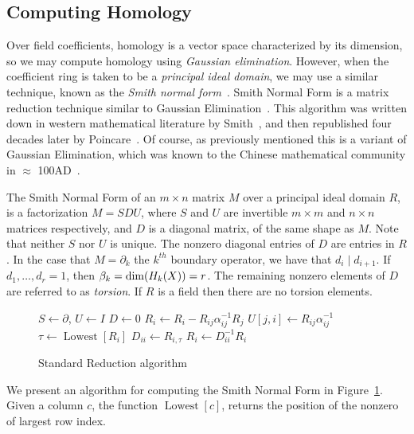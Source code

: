 \subsection{Computing Homology}
Over field coefficients, homology is a vector space characterized by its dimension, so we may compute homology using \emph{Gaussian elimination}. However, when the coefficient ring is taken to be a \emph{principal ideal domain}, we may use a similar technique, known as the \emph{Smith normal form}~\cite{uhlig}. Smith Normal Form is a matrix reduction technique similar to Gaussian Elimination~\cite{uhlig}. This algorithm was written down in western mathematical literature by Smith~\cite{smith}, and then republished four decades later by Poincare~\cite{poincare-smith}. Of course, as previously mentioned this is a variant of Gaussian Elimination, which was known to the Chinese mathematical community in $\approx$ 100AD~\cite{chinese-ge}.

The Smith Normal Form of an $m \times n$ matrix $M$ over a principal ideal domain $R$, is a factorization $M = SDU$, where $S$ and $U$ are invertible $m \times m$ and $n \times n$ matrices respectively, and $D$ is a diagonal matrix, of the same shape as $M$. Note that neither $S$ nor $U$ is unique. The nonzero diagonal entries of $D$ are entries in $R$. In the case that $M = \partial_k$ the $k^{th}$  boundary operator, we have that $d_i \mid d_{i+1}$. If $d_1, \ldots, d_r = 1$, then $\beta_k = \dim(H_k(X)) = r$. The remaining nonzero elements of $D$ are referred to as \emph{torsion}. If $R$ is a field then there are no torsion elements. 
\begin{figure}
\begin{codebox}
\li $S \gets \partial$, $U \gets I$
\li $D \gets 0$
\li {} 
\li \Do 
\li {}
\li \Do
\li   $R_i \gets R_i - R_{ij}\alpha^{-1}_{ij}R_j$
\li   $U[j,i] \gets R_{ij}\alpha^{-1}_{ij}$
    \End
\li   $\tau \gets \operatorname{Lowest}[R_i]$
\li   $D_{ii} \gets R_{i,\tau}$
\li   $R_{i} \gets D_{ii}^{-1}R_{i}$
\End
\end{codebox}
\caption{Standard Reduction algorithm}
\label{alg:smith}
\end{figure}

We present an algorithm for computing the Smith Normal Form in Figure~\ref{alg:smith}. Given a column $c$, the function $\operatorname{Lowest}[c]$, 
returns the position of the nonzero of largest row index.

